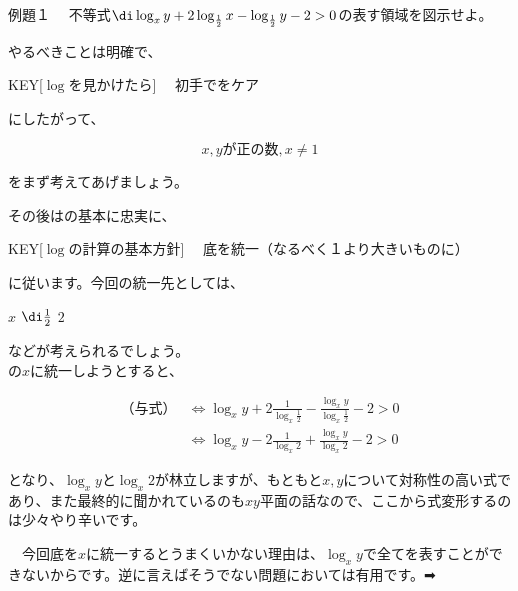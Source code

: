 \documentclass[8pt,b5paper,twoside]{ltjsreport}
\begin{document}
\begin{ascolorbox4}[静岡大]{例題１}
  　不等式$\di \log_x{y} + 2\log_{\frac{1}{2}}{x} - \log_{\frac{1}{2}}{y} - 2 > 0$の表す領域を図示せよ。
\end{ascolorbox4}
\begin{multicols*}{2}%

\tri やるべきことは明確で、

\begin{ptbs}{KEY}[$\log$を見かけたら]
  　初手でをケア
\end{ptbs}

にしたがって、

\[x, y が正の数, x \neq 1\]

をまず考えてあげましょう。

\tri その後はの基本に忠実に、

\begin{ptbs}{KEY}[$\log$の計算の基本方針]
  　底を統一（なるべく１より大きいものに）
\end{ptbs}

に従います。今回の統一先としては、

\begin{mydec1}\centering
   $x$ \hfill {} $\di \frac{1}{2}$ \hfill {} $2$
\end{mydec1}

などが考えられるでしょう。\\
\tri {}の$x$に統一しようとすると、

\begin{align*}
  \text{（与式）} &\Leftrightarrow \log_x{y} + 2 \frac{1}{\log_x{\frac{1}{2}}} - \frac{\log_x{y}}{\log_x{\frac{1}{2}}} - 2 > 0\\
  &\Leftrightarrow  \log_x{y} - 2 \frac{1}{\log_x{2}} + \frac{\log_x{y}}{\log_x{2}} - 2 > 0
\end{align*}

となり、$\log_x{y}$と$\log_x{2}$が林立しますが、もともと$x, y$について対称性の高い式であり、また最終的に聞かれているのも$xy$平面の話なので、ここから式変形するのは少々やり辛いです。

\begin{mydec4}
　今回底を$x$に統一するとうまくいかない理由は、$\log_x{y}$で全てを表すことができないからです。逆に言えばそうでない問題においては有用です。➡︎
\end{mydec4}


\end{multicols*}
\end{document}
